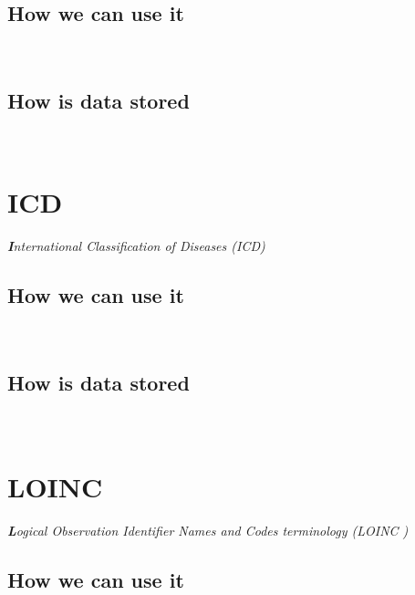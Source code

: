 \documentclass[DIV=calc, paper=a4, fontsize=12pt, onecolumn]{scrartcl}	 %
\newcommand{\initial}[1]{ %
\lettrine[lines=3,lhang=0.3,nindent=0em,slope=0em]{
\color{DarkBlue}
{\textbf{\textit{#1}}}}{}}
\begin{document}
  \subsection{How we can use it}\

\subsection{How is data stored}\



\section[International Classification of Diseases (ICD) ]{ICD}
  \label{sec:icd}

\initial{I}\textit{nternational Classification of Diseases (ICD)}\\

\subsection{How we can use it}\


\subsection{How is data stored}\


\section[Logical Observation Identifier Names and Codes terminology (LOINC\textsuperscript{\textregistered})] 
{LOINC\textsuperscript{\textregistered}}
  \label{sec:loinc}
  
\initial{L}\textit{ogical Observation Identifier Names and Codes terminology (LOINC )}\\



\subsection{How we can use it}\
\end{document}
